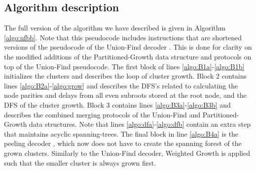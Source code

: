 \subsection{Algorithm description}\label{sec:pseudocode}

The full version of the algorithm we have described is given in Algorithm \ref{algo:ufbb}. Note that this pseudocode includes instructions that are shortened versions of the pseudocode of the Union-Find decoder \cite{delfosse2017almost}. This is done for clarity on the modified additions of the Partitioned-Growth data structure and protocols on top of the Union-Find pseudocode. The first block of lines \ref{algo:B1a}-\ref{algo:B1b} initializes the clusters and describes the loop of cluster growth. Block 2 contains lines \ref{algo:B2a}-\ref{algo:grow} and describes the DFS's related to calculating the node parities and delays from all even subroots stored at the root node, and the DFS of the cluster growth. Block 3 contains lines \ref{algo:B3a}-\ref{algo:B3b} and describes the combined merging protocols of the Union-Find and Partitioned-Growth data structures. Note that lines \ref{algo:dfa}-\ref{algo:dfb} contain an extra step that maintains acyclic spanning-trees. The final block in line \ref{algo:B4a} is the peeling decoder \cite{delfosse2017linear}, which now does not have to create the spanning forest of the grown clusters. Similarly to the Union-Find decoder, Weighted Growth is applied such that the smaller cluster is always grown first. 

